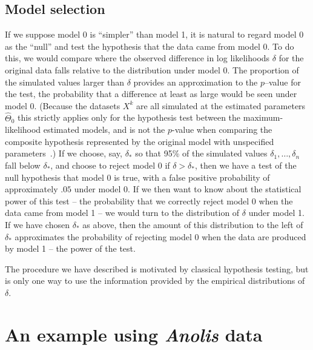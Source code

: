 \subsection{Model selection}
If we suppose model 0 is ``simpler'' than model 1, it is natural to regard model 0 as the ``null'' and test the hypothesis that the data came from model 0.
To do this, we would compare where the observed difference in log likelihoods $\delta$ for the original data falls relative to the distribution under model 0.
The proportion of the simulated values larger than $\delta$ 
provides an approximation to the $p$--value for the test, the probability that a difference at least as large 
would be seen under model 0.
(Because the datasets $X^k$ are all simulated at the estimated parameters $\hat \Theta_0$ this strictly applies only for the hypothesis test between the maximum-likelihood estimated models, and is not the $p$-value when comparing the composite hypothesis represented by the original model with unspecified parameters~\citep[see][]{McLachlan1987}.)
If we choose, say, $\delta_*$ so that 95\% of the simulated values $\delta_1, \ldots, \delta_n$ fall below $\delta_*$,
and choose to reject model 0 if $\delta > \delta_*$, then we have a test of the null hypothesis that model 0 is true, with a false positive probability of approximately $.05$ under model 0.
If we then want to know about the statistical power of this test --
the probability that we correctly reject model 0 when the data came from model 1 --
we would turn to the distribution of $\delta$ under model 1.
If we have chosen $\delta_*$ as above,
then the amount of this distribution to the left of $\delta_*$ approximates the probability of rejecting model 0 when the data are produced by model 1
-- the power of the test. 

The procedure we have described is motivated by classical hypothesis testing,
but is only one way to use the information provided by the empirical distributions of $\delta$.


\section{An example using {\it Anolis} data}\label{sect:Anoles}
